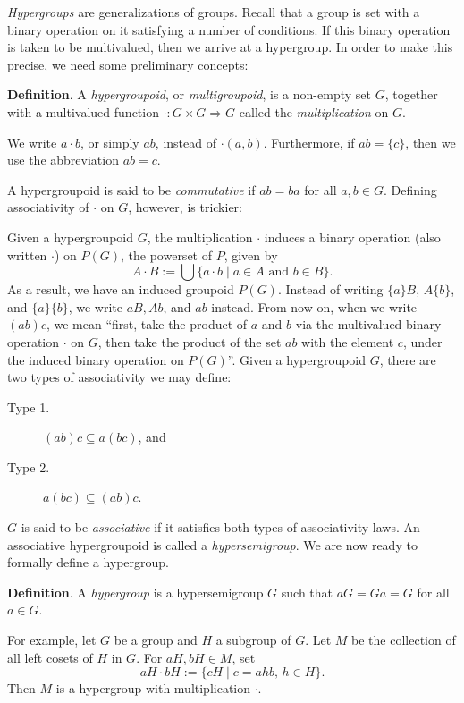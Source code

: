 \documentclass[12pt]{article}
\begin{document}
\emph{Hypergroups} are generalizations of groups.  Recall that a group is set with a binary operation on it satisfying a number of conditions.  If this binary operation is taken to be multivalued, then we arrive at a hypergroup.  In order to make this precise, we need some preliminary concepts:

\textbf{Definition}.  A \emph{hypergroupoid}, or \emph{multigroupoid}, is a non-empty set $G$, together with a multivalued function $\cdot: G\times G\Rightarrow G$ called the \emph{multiplication} on $G$.  

We write $a\cdot b$, or simply $ab$, instead of $\cdot(a,b)$.  Furthermore, if $ab=\lbrace c\rbrace$, then we use the abbreviation $ab=c$.

A hypergroupoid is said to be \emph{commutative} if $ab=ba$ for all $a,b\in G$.  Defining associativity of $\cdot$ on $G$, however, is trickier:

Given a hypergroupoid $G$, the multiplication $\cdot$ induces a binary operation (also written $\cdot$) on $P(G)$, the powerset of $P$, given by $$A\cdot B:=\bigcup \lbrace a\cdot b\mid a\in A\mbox{ and } b\in B\rbrace.$$
As a result, we have an induced groupoid $P(G)$.  Instead of writing $\lbrace a\rbrace B$, $A\lbrace b\rbrace$, and $\lbrace a\rbrace \lbrace b\rbrace$, we write $aB, Ab$, and $ab$ instead.  From now on, when we write $(ab)c$, we mean
``first, take the product of $a$ and $b$ via the multivalued binary operation $\cdot$ on $G$, then take the product of the set $ab$ with the element $c$, under the induced binary operation on $P(G)$''.  Given a hypergroupoid $G$, there are two types of associativity we may define:
\begin{description}
\item[Type 1.] $(ab)c\subseteq a(bc)$, and
\item[Type 2.] $a(bc)\subseteq (ab)c$.
\end{description} 
$G$ is said to be \emph{associative} if it satisfies both types of associativity laws.  An associative hypergroupoid is called a \emph{hypersemigroup}.  We are now ready to formally define a hypergroup.

\textbf{Definition}.  A \emph{hypergroup} is a hypersemigroup $G$ such that $aG=Ga=G$ for all $a\in G$.

For example, let $G$ be a group and $H$ a subgroup of $G$.  Let $M$ be the collection of all left cosets of $H$ in $G$.  For $aH,bH\in M$, set $$aH\cdot bH := \lbrace cH\mid c=ahb\mbox{, }h\in H\rbrace.$$  Then $M$ is a hypergroup with multiplication $\cdot$.
\end{document}
